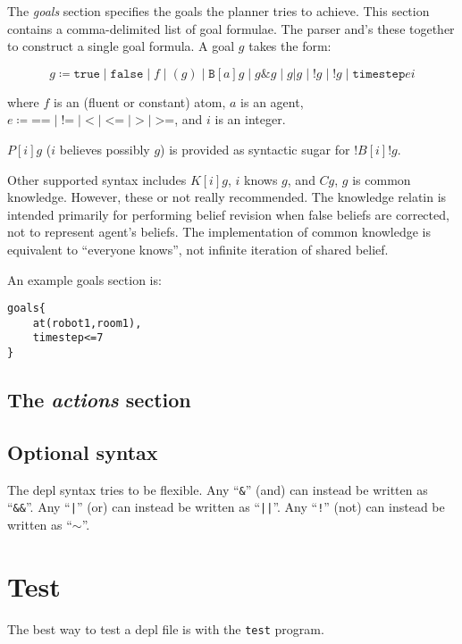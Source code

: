 \documentclass{article}
\begin{document}
The \emph{goals} section specifies the goals the planner tries to achieve.
This section contains a comma-delimited list of goal formulae. The parser and's
these together to construct a single goal formula. A goal $g$ takes the form:

$$
g \coloneq
\texttt{true}      \mid
\texttt{false}     \mid
f         \mid
(g)       \mid
\texttt{B}[a]g     \mid
g \& g     \mid
g | g     \mid
!g        \mid
!g        \mid
\texttt{timestep} e i
$$

\noindent
where $f$ is an (fluent or constant) atom, $a$ is an agent, 
$e \coloneq
\texttt{==} \mid
\texttt{!=} \mid
\texttt{<} \mid
\texttt{<=} \mid
\texttt{>} \mid
\texttt{>=}
$, and $i$ is an integer.

$P[i]g$ ($i$ believes possibly $g$) is provided as syntactic sugar for
$!B[i]!g$.

Other supported syntax includes $K[i]g$, $i$ knows $g$, and $Cg$, $g$ is common
knowledge. However, these or not really recommended. The knowledge relatin is
intended primarily for performing belief revision when false beliefs are
corrected, not to represent agent's beliefs. The implementation of common
knowledge is equivalent to ``everyone knows'', not infinite iteration of shared
belief.

An example goals section is:
\begin{verbatim}
goals{
    at(robot1,room1),
    timestep<=7
}
\end{verbatim}


\subsection{The \emph{actions} section}

\subsection{Optional syntax}

The depl syntax tries to be flexible.
Any
``\texttt{\&}''
(and) can instead be written as
``\texttt{\&\&}''.
Any
``\texttt{|}''
(or) can instead be written as
``\texttt{||}''.
Any
``\texttt{!}''
(not) can instead be written as
``$\sim$''.


\section{Test}
The best way to test a depl file is with the \verb|test| program.
\end{document}
